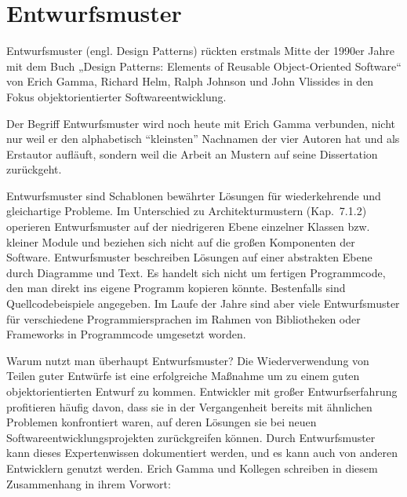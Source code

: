\cleardoublepage
\chapter{Entwurfsmuster}
\label{sec:Kap-10}

Entwurfsmuster (engl. Design Patterns) rückten erstmals Mitte der 1990er Jahre mit dem Buch „Design Patterns: Elements of Reusable Object-Oriented Software“ \cite{gam95} von Erich Gamma, Richard Helm, Ralph Johnson und John Vlissides in den Fokus objektorientierter Softwareentwicklung.

Der Begriff Entwurfsmuster wird noch heute mit Erich Gamma verbunden, nicht nur weil er den alphabetisch "`kleinsten"' Nachnamen der vier Autoren hat und als Erstautor aufläuft, sondern weil die Arbeit an Mustern auf seine Dissertation \mbox{zurückgeht}.

Entwurfsmuster sind Schablonen  bewährter Lösungen für wiederkehrende und gleichartige Probleme. Im Unterschied zu Architekturmustern (Kap.~7.1.2) %
operieren Entwurfsmuster auf der niedrigeren Ebene einzelner Klassen bzw. kleiner Module und beziehen sich nicht auf die großen Komponenten der Software. Entwurfsmuster beschreiben Lösungen auf einer abstrakten Ebene durch Diagramme und Text. Es handelt sich nicht um fertigen Programmcode, den man direkt ins eigene Programm kopieren könnte. Bestenfalls sind Quellcodebeispiele angegeben. Im Laufe der Jahre sind aber viele Entwurfsmuster für verschiedene Programmiersprachen im Rahmen von Bibliotheken oder Frameworks in Programmcode umgesetzt worden.

Warum nutzt  man überhaupt Entwurfsmuster? Die Wiederverwendung von Teilen guter Entwürfe ist eine erfolgreiche Maßnahme um zu einem guten objekt\-orientierten Entwurf zu kommen. Entwickler mit großer Entwurfserfahrung profitieren häufig davon, dass sie in der Vergangenheit bereits mit ähnlichen Problemen konfrontiert waren, auf deren Lösungen sie bei neuen Softwareentwicklungsprojekten zurück\-greifen können. Durch Entwurfsmuster kann dieses Expertenwissen dokumentiert werden, und es kann auch von anderen Entwicklern genutzt werden. Erich Gamma und Kollegen schreiben in diesem Zusammenhang in ihrem Vorwort:


